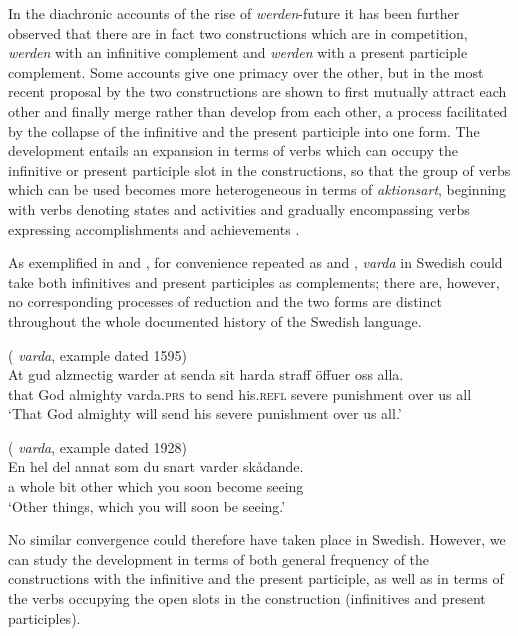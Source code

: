 \documentclass[output=paper,colorlinks,citecolor=brown]{langscibook}
\begin{document}
In the diachronic accounts of the rise of \textit{werden}-future it has been further observed that there are in fact two constructions which are in competition, \textit{werden} with an infinitive complement and \textit{werden} with a present participle complement. Some accounts give one primacy over the other, but in the most recent proposal by \citet[]{Hartmann2021} the two constructions are shown to first mutually attract each other and finally merge rather than develop from each other, a process facilitated by the collapse of the infinitive and the present participle into one form. The development entails an expansion in terms of verbs which can occupy the infinitive or present participle slot in the constructions, so that the group of verbs which can be used becomes more heterogeneous in terms of \textit{aktionsart}, beginning with verbs denoting states and activities and gradually encompassing verbs expressing accomplishments and achievements \citep[]{Hartmann2021}. 

As exemplified in  and , for convenience repeated as  and , \textit{varda} in Swedish could take both infinitives and present participles as complements; there are, however, no corresponding processes of reduction and the two forms are distinct throughout the whole documented history of the Swedish language. 

\ea \label{ex:skrzypek:9}
    (\citeauthor{SAOB} \textit{varda}, example dated 1595)\\
    \gll At gud alzmectig warder at senda sit harda straff öffuer oss alla.\\
    that God almighty varda.\textsc{prs} to send his.\textsc{refl} severe punishment over us all\\
    \glt ‘That God almighty will send his severe punishment over us all.’
\z

\ea \label{ex:skrzypek:10}
    (\citeauthor{SAOB} \textit{varda}, example dated 1928)\\
    \gll En hel del annat som du snart varder skådande.\\
    a whole bit other which you soon become seeing\\
    \glt ‘Other things, which you will soon be seeing.’
\z


No similar convergence could therefore have taken place in Swedish. However, we can study the development in terms of both general frequency of the constructions with the infinitive and the present participle, as well as in terms of the verbs occupying the open slots in the construction (infinitives and present participles). 
\end{document}
